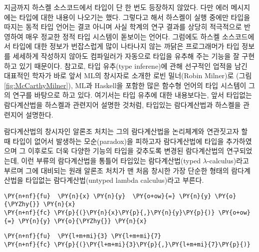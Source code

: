 지금까지 하스켈 소스코드에서 타입이 단 한 번도 등장하지 않았다. 다만
에러 메시지에는 타입에 대한 내용이 나오기는 했다. 그렇다고 해서 하스켈이
실행 중에만 타입을 따지는 동적 타입 언어는 결코 아니며 사실 학계의 연구
결과를 상당히 적극적으로 반영하여 매우 정교한 정적 타입 시스템이
돋보이는 언어다. 그럼에도 하스켈 소스코드에서 타입에 대한 정보가
번잡스럽게 많이 나타나지 않는 까닭은 프로그래머가 타입 정보를 세세하게
작성하지 않아도 컴파일러가 자동으로 타입을 유추해 주는 기능을 잘
구현하고 있기 때문이다. 참고로, 타입 유추(type inferene)에 관해 선구적인
업적을 남긴 대표적인 학자가 바로 앞서 ML의 창시자로 소개한 로빈
밀너(Robin Milner)로 (그림 \ref{fig:McCarthyMilner}), ML과 Haskell을
포함한 많은 함수형 언어의 타입 시스템이 그의 연구를 바탕으로 하고 있다.
여기서는 타입 유추에 대한 내용보다는, 앞서 타입없는 람다계산법을
하스켈과 관련지어 설명한 것처럼, 타입있는 람다계산법과 하스켈을 관련지어
설명한다.

람다계산법의 창시자인 알론조 처치는 그의 람다계산법을 논리체계와
연관짓고자 할 때 타입이 없어서 발생하는 모순(paradox)을 피하고자
람다계산법에 타입을 추가하였으며 그 이후로도 더욱 다양한 기능의 타입을
갖추도록 변경된 람다계산법의 연구되었는데, 이런 부류의 람다계산법을
통틀어 타입있는 람다계산법(typed \(\lambda\)-calculus)라고 부르며 그에
대비되는 원래 알론조 처치가 맨 처음 창시한 가장 단순한 형태의
람다계산법을 타입없는 람다계산법(untyped lambda calculus)라고 부른다.

    \begin{tcolorbox}[breakable, size=fbox, boxrule=1pt, pad at break*=1mm,colback=cellbackground, colframe=cellborder, top=.75ex]
\begin{Verbatim}[commandchars=\\\{\}]
\PY{n+nf}{fu}  \PY{n}{x} \PY{n}{y}  \PY{o+ow}{=} \PY{n}{y} \PY{o}{\PYZhy{}} \PY{n}{x}
\PY{n+nf}{fc} \PY{p}{(}\PY{n}{x}\PY{p}{,}\PY{n}{y}\PY{p}{)} \PY{o+ow}{=} \PY{n}{y} \PY{o}{\PYZhy{}} \PY{n}{x}
\end{Verbatim}
\end{tcolorbox}

    \begin{tcolorbox}[breakable, size=fbox, boxrule=1pt, pad at break*=1mm,colback=cellbackground, colframe=cellborder, top=.75ex]
\begin{Verbatim}[commandchars=\\\{\}]
\PY{n+nf}{fu}  \PY{l+m+mi}{3} \PY{l+m+mi}{7}
\PY{n+nf}{fc} \PY{p}{(}\PY{l+m+mi}{3}\PY{p}{,}\PY{l+m+mi}{7}\PY{p}{)}
\end{Verbatim}
\end{tcolorbox}

